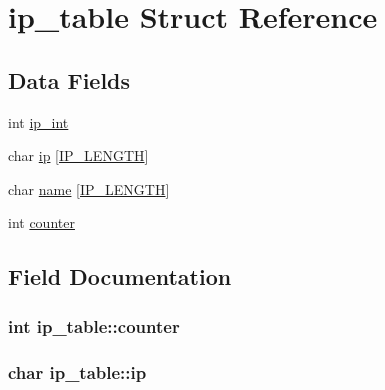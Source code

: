 \hypertarget{structip__table}{}\section{ip\+\_\+table Struct Reference}
\label{structip__table}
\subsection*{Data Fields}
\begin{DoxyCompactItemize}
\item 
int \hyperlink{structip__table_a164501eaaa381a490d1b477b6202a3f4}{ip\+\_\+int}
\item 
char \hyperlink{structip__table_a1b131a25f90be6f047bcbac01fd23702}{ip} \mbox{[}\hyperlink{ips_8c_a26af4e86634a5afbbe4ae1326886c9b2}{I\+P\+\_\+\+L\+E\+N\+G\+TH}\mbox{]}
\item 
char \hyperlink{structip__table_af74e25ef3abad1b79ca32e25cd0e1ca3}{name} \mbox{[}\hyperlink{ips_8c_a26af4e86634a5afbbe4ae1326886c9b2}{I\+P\+\_\+\+L\+E\+N\+G\+TH}\mbox{]}
\item 
int \hyperlink{structip__table_a86455cd9e7c6fe05bdb4a0e1c1e78c55}{counter}
\end{DoxyCompactItemize}


\subsection{Field Documentation}
\subsubsection[{\texorpdfstring{counter}{counter}}]{\setlength{\rightskip}{0pt plus 5cm}int ip\+\_\+table\+::counter}\hypertarget{structip__table_a86455cd9e7c6fe05bdb4a0e1c1e78c55}{}\label{structip__table_a86455cd9e7c6fe05bdb4a0e1c1e78c55}
\subsubsection[{\texorpdfstring{ip}{ip}}]{\setlength{\rightskip}{0pt plus 5cm}char ip\+\_\+table\+::ip}\hypertarget{structip__table_a1b131a25f90be6f047bcbac01fd23702}{}\label{structip__table_a1b131a25f90be6f047bcbac01fd23702}

